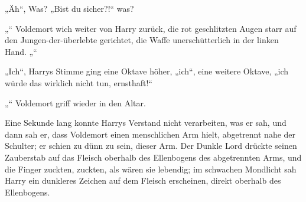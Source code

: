 „Äh“, Was?
„Bist du sicher?!“ was?

„“
Voldemort wich weiter von Harry zurück, die rot geschlitzten Augen starr auf den Jungen-der-überlebte gerichtet, die Waffe unerschütterlich in der linken Hand.
„“

„Ich“, Harrys Stimme ging eine Oktave höher,
„ich“, eine weitere Oktave, „ich würde das wirklich nicht tun, ernsthaft!“

„“
Voldemort griff wieder in den Altar.

Eine Sekunde lang konnte Harrys Verstand nicht verarbeiten, was er sah, und dann sah er, dass Voldemort einen menschlichen Arm hielt, abgetrennt nahe der Schulter; er schien zu dünn zu sein, dieser Arm.
Der Dunkle Lord drückte seinen Zauberstab auf das Fleisch oberhalb des Ellenbogens des abgetrennten Arms, und die Finger zuckten, zuckten, als wären sie lebendig; im schwachen Mondlicht sah Harry ein dunkleres Zeichen auf dem Fleisch erscheinen, direkt oberhalb des Ellenbogens.

